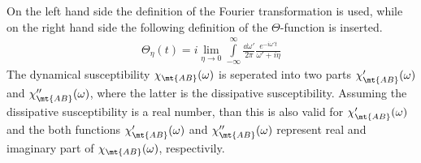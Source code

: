 %
On the left hand side the definition of the Fourier transformation is used, while on the right hand side the following definition of the $\Theta$-function is inserted.
%
\begin{align}
	\Theta_{\eta}(t) = i \lim\limits_{\eta \to 0} \int\limits_{-\infty}^{\infty} \frac{\dd{\omega'}}{2\pi} \frac{e^{-i\omega't}}{\omega' + i\eta} 
\end{align}
%
The dynamical susceptibility $\chi_{\mt{AB}}(\omega)$ is seperated into two parts $\chi'_{\mt{AB}}(\omega)$ and $\chi''_{\mt{AB}}(\omega)$, where the latter is the dissipative susceptibility.
Assuming the dissipative susceptibility is a real number, than this is also valid for $\chi'_{\mt{AB}}(\omega)$ and the both functions $\chi'_{\mt{AB}}(\omega)$ and $\chi''_{\mt{AB}}(\omega)$ represent real and imaginary part of $\chi_{\mt{AB}}(\omega)$, respectivily.





%
%
